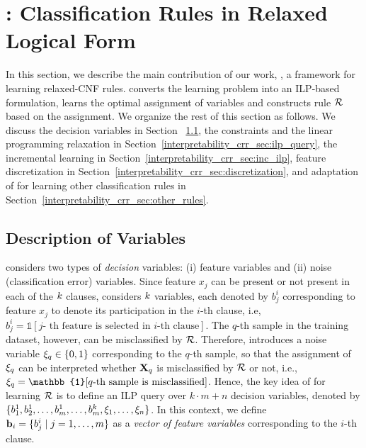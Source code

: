 \section{{\crr}: Classification Rules in Relaxed Logical Form}
\label{interpretability_crr_sec:ilp}
In this section, we describe the main contribution of our work, {\crr}, a  framework for learning   relaxed-CNF rules.  {\crr}  converts the learning problem into  an ILP-based formulation,  learns the optimal assignment of variables and constructs rule $ {\mathcal{R}} $ based on the assignment. We organize the rest of this section as follows.
We  discuss the decision variables in Section ~\ref{interpretability_crr_sec:variables},  the constraints and the linear programming relaxation in Section~\ref{interpretability_crr_sec:ilp_query}, the incremental learning in Section~\ref{interpretability_crr_sec:inc_ilp}, feature discretization in Section~\ref{interpretability_crr_sec:discretization}, and adaptation of {\crr} for learning other classification rules in Section~\ref{interpretability_crr_sec:other_rules}.




\subsection{Description of Variables}
\label{interpretability_crr_sec:variables}
{\crr} considers two types of  \emph{decision} variables: (i) feature variables and (ii) noise (classification error) variables.
Since  feature $ x_j $ can be present or not present  in each of  the  $ k $ clauses, {\crr} considers $ k $   variables, each denoted by $ b^i_j  $  corresponding to   feature $ x_j $  to denote its participation  in the $ i $-th clause, i.e, $ b^i_j=\mathbb{1}[j\text{- th feature is selected in }i\text{-th clause}]  $.  The $ q $-th sample in the training dataset, however, can be misclassified by $ {\mathcal{R}} $.  Therefore, {\crr}  introduces  a noise variable $ \xi_q \in \{0,1\}  $  corresponding to the $ q $-th sample, so that the assignment of $ \xi_q  $ can be interpreted whether $ {\mathbf{X}}_q $ is misclassified by $ {\mathcal{R}} $ or not, i.e., $ \noise_q=\mathbb{1}[q\text{-th sample is misclassified}] $.  Hence, the key idea of {{\crr}} for learning $ {\mathcal{R}} $ is to define an ILP query over $k \cdot m + n$  decision variables, denoted by $\{ b_{1}^{1}, b_{2}^{1}, \dots ,b_{m}^{1}, \dots ,b_{m}^{k}, \xi_1, \dots ,\xi_n\}$.   In this context, we define $\mathbf{b}_i = \{b^i_{j} \mid j= 1,\dots,m\}$ as a \emph{vector of   feature variables} corresponding to the $ i $-th clause.



